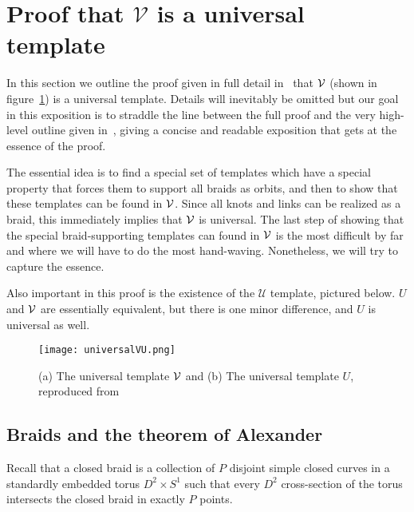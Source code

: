 \documentclass[paper.tex]{subfiles}
\begin{document}
\section{Proof that $\mathcal{V}$ is a universal template}

In this section we outline the proof given in full detail in~\cite{Ghrist1996} that $\mathcal{V}$ (shown in figure~\ref{fig:universal}) is a universal template. Details will inevitably be omitted but our goal in this exposition is to straddle the line between
the full proof and the very high-level outline given in~\cite{knottyode}, giving a concise and readable exposition that gets at the essence of the proof.

The essential idea is to find a special set of templates which have a special property that forces them to support all braids as orbits, and then to show that these templates can be found in $\mathcal{V}$. Since all knots and links
can be realized as a braid, this immediately implies that $\mathcal{V}$ is universal. The last step of showing that the special braid-supporting templates can found in $\mathcal{V}$ is the most difficult by far and where we will have to do the
most hand-waving. Nonetheless, we will try to capture the essence.

Also important in this proof is the existence of the $\mathcal{U}$ template, pictured below. $U$ and $\mathcal{V}$ are essentially equivalent, but there is one minor difference, and $U$ is universal as well.

\begin{figure}[h]

  \centering
  \texttt{[image: universalVU.png]}
  \caption{(a) The universal template $\mathcal{V}$ and (b) The universal template $U$, reproduced from~\cite{ghrist1997knots}}\label{fig:universal}
\end{figure}


\subsection{Braids and the theorem of Alexander}

Recall that a closed braid is a collection of $P$ disjoint simple closed curves in a standardly embedded torus $D^2 \times S^1$ such that every $D^2$ cross-section of the torus intersects the closed braid in exactly $P$ points.
\end{document}
